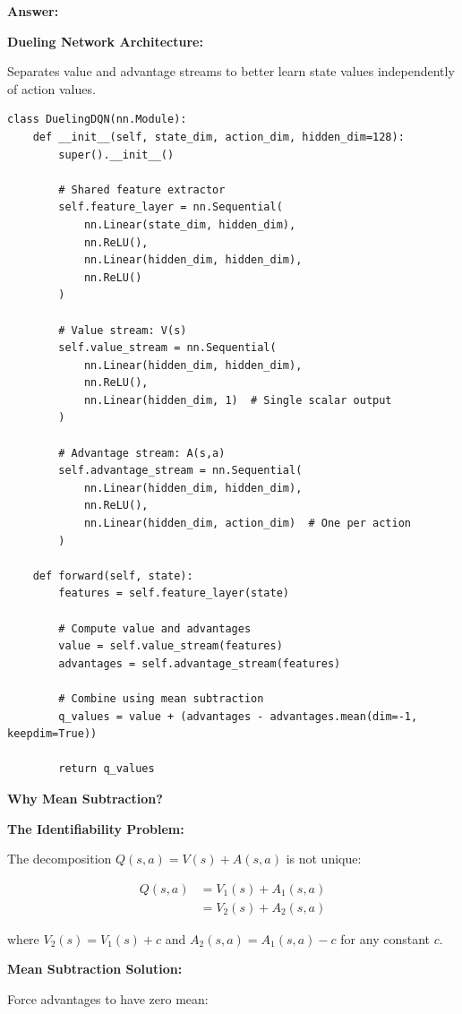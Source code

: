 \documentclass[12pt]{article}
\begin{document}
{{\textbf{Answer:}

\textbf{Dueling Network Architecture:}

Separates value and advantage streams to better learn state values independently of action values.

\begin{verbatim}
class DuelingDQN(nn.Module):
    def __init__(self, state_dim, action_dim, hidden_dim=128):
        super().__init__()

        # Shared feature extractor
        self.feature_layer = nn.Sequential(
            nn.Linear(state_dim, hidden_dim),
            nn.ReLU(),
            nn.Linear(hidden_dim, hidden_dim),
            nn.ReLU()
        )

        # Value stream: V(s)
        self.value_stream = nn.Sequential(
            nn.Linear(hidden_dim, hidden_dim),
            nn.ReLU(),
            nn.Linear(hidden_dim, 1)  # Single scalar output
        )

        # Advantage stream: A(s,a)
        self.advantage_stream = nn.Sequential(
            nn.Linear(hidden_dim, hidden_dim),
            nn.ReLU(),
            nn.Linear(hidden_dim, action_dim)  # One per action
        )

    def forward(self, state):
        features = self.feature_layer(state)

        # Compute value and advantages
        value = self.value_stream(features)
        advantages = self.advantage_stream(features)

        # Combine using mean subtraction
        q_values = value + (advantages - advantages.mean(dim=-1, keepdim=True))

        return q_values
\end{verbatim}

\textbf{Why Mean Subtraction?}

\textbf{The Identifiability Problem:}

The decomposition $Q(s,a) = V(s) + A(s,a)$ is not unique:

\begin{align}
Q(s,a) &= V_1(s) + A_1(s,a) \\
&= V_2(s) + A_2(s,a)
\end{align}

where $V_2(s) = V_1(s) + c$ and $A_2(s,a) = A_1(s,a) - c$ for any constant $c$.

\textbf{Mean Subtraction Solution:}

Force advantages to have zero mean:

}}
\end{document}
